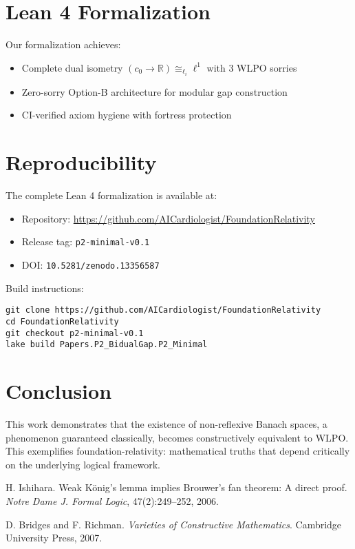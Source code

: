\documentclass{article}
\begin{document}
\section{Lean 4 Formalization}

Our formalization achieves:
\begin{itemize}
\item Complete dual isometry $(c_0 \to \mathbb{R}) \cong_{\ell_i} \ell^1$ with 3 WLPO sorries
\item Zero-sorry Option-B architecture for modular gap construction
\item CI-verified axiom hygiene with fortress protection
\end{itemize}

\section{Reproducibility}

The complete Lean 4 formalization is available at:
\begin{itemize}
\item Repository: \url{https://github.com/AICardiologist/FoundationRelativity}
\item Release tag: \texttt{p2-minimal-v0.1}
\item DOI: \texttt{10.5281/zenodo.13356587}
\end{itemize}

Build instructions:
\begin{verbatim}
git clone https://github.com/AICardiologist/FoundationRelativity
cd FoundationRelativity
git checkout p2-minimal-v0.1
lake build Papers.P2_BidualGap.P2_Minimal
\end{verbatim}

\section{Conclusion}

This work demonstrates that the existence of non-reflexive Banach spaces, a phenomenon guaranteed classically, becomes constructively equivalent to WLPO. This exemplifies foundation-relativity: mathematical truths that depend critically on the underlying logical framework.


\begin{thebibliography}{1}

H. Ishihara. Weak K\"{o}nig's lemma implies Brouwer's fan theorem: A direct proof. \textit{Notre Dame J. Formal Logic}, 47(2):249--252, 2006.

D. Bridges and F. Richman. \textit{Varieties of Constructive Mathematics}. Cambridge University Press, 2007.

\end{thebibliography}
\end{document}
